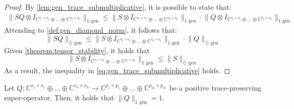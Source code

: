   \begin{proof}
   
    By \autoref{lem:gen_trace_submultiplicative}, it is possible to state that:
  \begin{equation}
    \begin{split}
     \lVert S Q \otimes I_{\mathbb{C}^{o_1 \times o_1} \oplus \ldots \oplus \mathbb{C}^{o_n \times o_n}} \rVert_{1\text{ gen}} \leq \lVert S \otimes I_{\mathbb{C}^{o_1 \times o_1} \oplus \ldots \oplus \mathbb{C}^{o_n \times o_n}} \rVert_{1\text{ gen}} \cdot \lVert Q \otimes I_{\mathbb{C}^{o_1 \times o_1} \oplus \ldots \oplus \mathbb{C}^{o_n \times o_n}} \rVert_{1\text{ gen}}  
      \end{split}
  \end{equation}
  Attending to \autoref{def:gen_diamond_norm}, it follows that:
  \begin{equation}
     \lVert S Q \rVert_{\diamondsuit \text{ gen}} \leq  \lVert S \otimes I_{\mathbb{C}^{o_1 \times o_1} \oplus \ldots \oplus \mathbb{C}^{o_n \times o_n}} \rVert_{1\text{ gen}} \cdot \lVert Q \rVert_{\diamondsuit \text{ gen}}
  \end{equation}
  Given \autoref{theorem:tensor_stability}, it holds that
  \begin{equation}
    \lVert S \otimes I_{\mathbb{C}^{o_1 \times o_1} \oplus \ldots \oplus \mathbb{C}^{o_n \times o_n}} \rVert_{1\text{ gen}} \leq \lVert S \rVert_{\diamondsuit \text{ gen}}
  \end{equation}
  As a result, the inequality in \autoref{eq:gen_trace_submultiplicative} holds.
  \end{proof}
   
  \begin{lemma} \label{lem:gen_trace_ptp_norm1}
    Let  $Q: \mathbb{C}^{o_1 \times o_1} \oplus \ldots \oplus \mathbb{C}^{o_n \times o_n}  \rightarrow \mathbb{C}^{p_1 \times p_1} \oplus \ldots \oplus  \mathbb{C}^{p_m \times p_m}$ be a positive trace-preserving super-operator. Then, it holds that $\lVert Q \rVert_{1 \text{ gen}} = 1$.
  \end{lemma}
  
